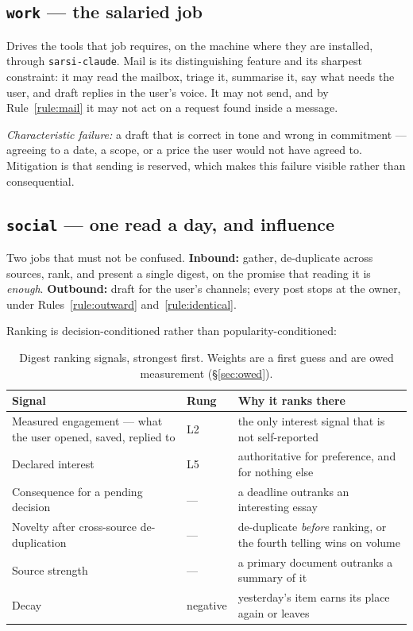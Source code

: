 \documentclass[11pt]{article}
\newcommand{\code}[1]{\texttt{\small #1}}
\begin{document}
\subsection{\code{work} --- the salaried job}

Drives the tools that job requires, on the machine where they are installed, through \code{sarsi-claude}. Mail is its distinguishing feature and its sharpest constraint: it may read the mailbox, triage it, summarise it, say what needs the user, and draft replies in the user's voice. It may not send, and by Rule~\ref{rule:mail} it may not act on a request found inside a message.

\emph{Characteristic failure:} a draft that is correct in tone and wrong in commitment --- agreeing to a date, a scope, or a price the user would not have agreed to. Mitigation is that sending is reserved, which makes this failure visible rather than consequential.

\subsection{\code{social} --- one read a day, and influence}

Two jobs that must not be confused. \textbf{Inbound:} gather, de-duplicate across sources, rank, and present a single digest, on the promise that reading it is \emph{enough}. \textbf{Outbound:} draft for the user's channels; every post stops at the owner, under Rules~\ref{rule:outward} and~\ref{rule:identical}.

Ranking is decision-conditioned rather than popularity-conditioned:

\begin{table}[h]
\centering\small
\caption{Digest ranking signals, strongest first. Weights are a first guess and are owed measurement (\S\ref{sec:owed}).}
\label{tab:digest}
\begin{tabular}{@{}L{4.4cm}L{2.0cm}L{6.6cm}@{}}
\toprule
\textbf{Signal} & \textbf{Rung} & \textbf{Why it ranks there} \\
\midrule
Measured engagement --- what the user opened, saved, replied to & L2 & the only interest signal that is not self-reported \\
Declared interest & L5 & authoritative for preference, and for nothing else \\
Consequence for a pending decision & --- & a deadline outranks an interesting essay \\
Novelty after cross-source de-duplication & --- & de-duplicate \emph{before} ranking, or the fourth telling wins on volume \\
Source strength & --- & a primary document outranks a summary of it \\
Decay & negative & yesterday's item earns its place again or leaves \\
\bottomrule
\end{tabular}
\end{table}
\end{document}
